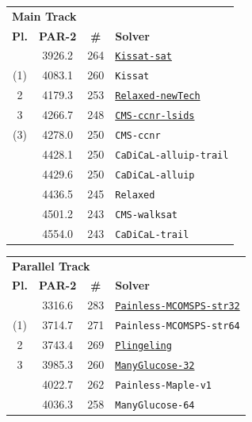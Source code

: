 \documentclass{elsarticle}
\newcommand{\solver}[1]{\texttt{#1}}
\newcommand{\solbert}[1]{\underline{\solver{#1}}}
\begin{document}
\begin{table}
\centering\smaller
\setlength\tabcolsep{3pt}
\begin{tabularx}{.47\linewidth}{cccX}
\multicolumn{4}{l}{\bf Main Track}\\
\bf Pl. & \bf PAR-2 & \bf \# & \bf Solver \\
\arrayrulecolor{lightgray}\hline
1     & 3926.2 & 264 & \solbert{Kissat-sat} \\
(1)   & 4083.1 & 260 & \solver{Kissat} \\
2     & 4179.3 & 253 & \solbert{Relaxed-newTech} \\
3     & 4266.7 & 248 & \solbert{CMS-ccnr-lsids} \\
(3)   & 4278.0 & 250 & \solver{CMS-ccnr} \\
      & 4428.1 & 250 & \solver{CaDiCaL-alluip-trail} \\
      & 4429.6 & 250 & \solver{CaDiCaL-alluip} \\
      & 4436.5 & 245 & \solver{Relaxed} \\
      & 4501.2 & 243 & \solver{CMS-walksat} \\
      & 4554.0 & 243 & \solver{CaDiCaL-trail}%
\end{tabularx}\quad%
\begin{tabularx}{.5\linewidth}{cccX}
\multicolumn{4}{l}{\bf Parallel Track}\\
\bf Pl. & \bf PAR-2 & \bf \# & \bf Solver \\
\arrayrulecolor{lightgray}\hline
 1 & 3316.6 & 283 & \solbert{Painless-MCOMSPS-str32} \\
(1)& 3714.7 & 271 & \solver{Painless-MCOMSPS-str64} \\
 2 & 3743.4 & 269 & \solbert{Plingeling} \\
 3 & 3985.3 & 260 & \solbert{ManyGlucose-32} \\
   & 4022.7 & 262 & \solver{Painless-Maple-v1} \\
   & 4036.3 & 258 & \solver{ManyGlucose-64} \\

\end{tabularx}
\end{table}
\end{document}
